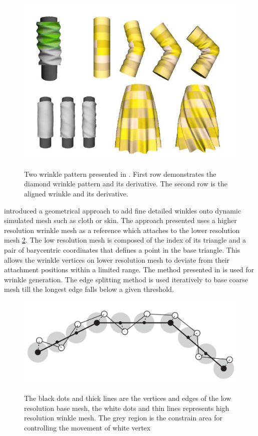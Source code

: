 \begin{figure}[ht]
    \centering
	\includegraphics[width=0.7\columnwidth]{../images/decaudin}\\[1cm]
    \caption{Two wrinkle pattern presented in \cite{DJWBSC06}. First row demonstrates the  diamond wrinkle pattern and its derivative. The second row is the aligned wrinkle and its derivative.}
    \label{figure:decaudin}
\end{figure}


\cite{Muller:2010} introduced a geometrical approach to add fine detailed winkles onto dynamic simulated mesh such as cloth or skin. The approach presented uses a higher resolution wrinkle mesh as a reference which attaches to the lower resolution mesh \ref{figure:Muller2010}. The low resolution mesh is composed of the index of its triangle and a pair of barycentric  coordinates that defines a point in the base triangle.  This allows the wrinkle vertices on lower resolution mesh to deviate from their attachment positions within a limited range. The method presented in \cite{Muller:2004} is used for wrinkle generation. The edge splitting method is used iteratively to base coarse mesh till the longest edge falls below a given threshold.

\begin{figure}[ht]
    \centering
	\includegraphics[width=0.7\columnwidth]{../images/Muller2010}\\[1cm]
    \caption{The black dots and thick lines are the vertices and edges of the low resolution base mesh, the white dots and thin lines represents high resolution winkle mesh. The grey region is the constrain area for controlling the movement of white vertex \cite{Muller:2010}}
    \label{figure:Muller2010}
\end{figure}


